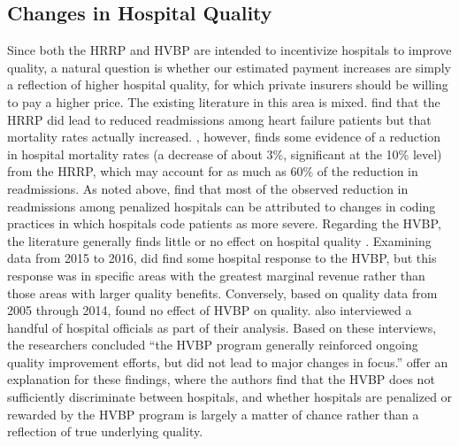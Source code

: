 \documentclass[12pt]{article}
\begin{document}
\subsection{Changes in Hospital Quality}
Since both the HRRP and HVBP are intended to incentivize hospitals to improve quality, a natural question is whether our estimated payment increases are simply a reflection of higher hospital quality, for which private insurers should be willing to pay a higher price. The existing literature in this area is mixed. \cite{gupta2017} find that the HRRP did lead to reduced readmissions among heart failure patients but that mortality rates actually increased. \cite{gupta2016}, however, finds some evidence of a reduction in hospital mortality rates (a decrease of about 3\%, significant at the 10\% level) from the HRRP, which may account for as much as 60\% of the reduction in readmissions.  As noted above, \citet{Ibrahim2017} find that most of the observed reduction in readmissions among penalized hospitals can be attributed to changes in coding practices in which hospitals code patients as more severe.  Regarding the HVBP, the literature generally finds little or no effect on hospital quality \citep{ryan2015,doran2017,norton2017,ryan2017}. Examining data from 2015 to 2016, \cite{norton2017} did find some hospital response to the HVBP, but this response was in specific areas with the greatest marginal revenue rather than those areas with larger quality benefits. Conversely, based on quality data from 2005 through 2014, \cite{gao2015} found no effect of HVBP on quality. \cite{gao2015} also interviewed a handful of hospital officials as part of their analysis. Based on these interviews, the researchers concluded ``the HVBP program generally reinforced ongoing quality improvement efforts, but did not lead to major changes in focus.'' \cite{friedson2016} offer an explanation for these findings, where the authors find that the HVBP does not sufficiently discriminate between hospitals, and whether hospitals are penalized or rewarded by the HVBP program is largely a matter of chance rather than a reflection of true underlying quality.
\end{document}
